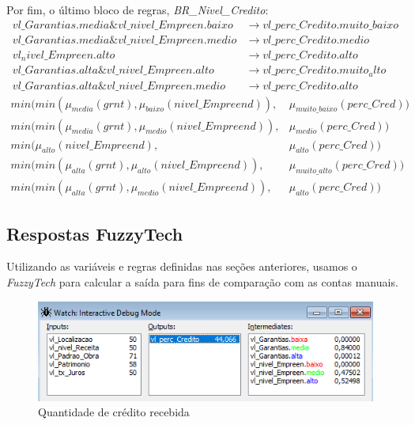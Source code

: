 \documentclass[12pt]{article}
\begin{document}
Por fim, o último bloco de regras, \textit{BR\_Nivel\_Credito}:
\begin{align*}
	vl\_Garantias.media\&vl\_nivel\_Empreen.baixo&\to vl\_perc\_Credito.muito\_baixo\\
	vl\_Garantias.media\&vl\_nivel\_Empreen.medio&\to vl\_perc\_Credito.medio\\
	vl_nivel\_Empreen.alto&\to vl\_perc\_Credito.alto\\
	vl\_Garantias.alta\&vl\_nivel\_Empreen.alto&\to vl\_perc\_Credito.muito_alto\\
	vl\_Garantias.alta\&vl\_nivel\_Empreen.medio&\to vl\_perc\_Credito.alto
\end{align*}
\begin{align*}
	min(min(\mu_{media}(grnt),\mu_{baixo}(nivel\_Empreend)),&\mu_{muito\_baixo}(perc\_Cred))\\
	min(min(\mu_{media}(grnt),\mu_{medio}(nivel\_Empreend)),&\mu_{medio}(perc\_Cred))\\
	min(\mu_{alto}(nivel\_Empreend),&\mu_{alto}(perc\_Cred))\\
	min(min(\mu_{alta}(grnt),\mu_{alto}(nivel\_Empreend)),&\mu_{muito\_alto}(perc\_Cred))\\
	min(min(\mu_{alta}(grnt),\mu_{medio}(nivel\_Empreend)),&\mu_{alto}(perc\_Cred))
\end{align*}
	
\subsection{Respostas FuzzyTech}

Utilizando as variáveis e regras definidas nas seções anteriores, usamos o \textit{FuzzyTech} para calcular a saída para fins de comparação com as contas manuais.

\begin{figure}[H]
	\centering
	\includegraphics[width=0.8\linewidth]{Imagens/financiamento/ResultadoFinalOriginal}
	\caption{Quantidade de crédito recebida}
	\label{fig:resultadofinaloriginal}
\end{figure}
\end{document}
